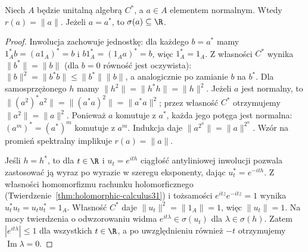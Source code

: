 \begin{lemat}
\label{lem:cstar-normal31}
Niech $A$ będzie unitalną algebrą $C^*$, a $a\in A$ elementem
normalnym. Wtedy $r(a)=\|a\|$.
Jeżeli $a=a^*$, to $\sigma(a)\subseteq\R$.
\end{lemat}
\begin{proof}
Inwolucja zachowuje jednostkę: dla każdego $b=a^*$
mamy $1_A^* b=(a1_A)^*=b$ i $b1_A^*=(1_Aa)^*=b$,
więc $1_A^*=1_A$. Z własności $C^*$ wynika
$\|b^*\|=\|b\|$ (dla $b=0$ równość jest oczywista):
$\|b\|^2=\|b^*b\|\le\|b^*\|\|b\|$,
a analogicznie po zamianie $b$ na $b^*$.
Dla samosprzężonego $h$ mamy
$\|h^2\|=\|h^*h\|=\|h\|^2$.
Jeżeli $a$ jest normalny, to
$\|(a^2)^*a^2\|=\|(a^*a)^2\|=\|a^*a\|^2$;
przez własność $C^*$ otrzymujemy $\|a^2\|=\|a\|^2$.
Ponieważ $a$ komutuje z $a^*$, każda jego potęga jest
normalna: $(a^m)^*=(a^*)^m$ komutuje z $a^m$.
Indukcja daje $\|a^{2^n}\|=\|a\|^{2^n}$.
Wzór na promień spektralny implikuje $r(a)=\|a\|$.

Jeśli $h=h^*$, to dla $t\in\R$ i $u_t=e^{ith}$
ciągłość antyliniowej inwolucji pozwala zastosować ją
wyraz po wyrazie w szeregu eksponenty, dając
$u_t^*=e^{-ith}$. Z własności homomorfizmu rachunku
holomorficznego (Twierdzenie~\ref{thm:holomorphic-calculus31})
i tożsamości $e^{itz}e^{-itz}=1$ wynika
$u_t^*u_t=u_tu_t^*=1_A$. Własność $C^*$ daje
$\|u_t\|^2=\|1_A\|=1$, więc $\|u_t\|=1$.
Na mocy twierdzenia o odwzorowaniu widma
$e^{it\lambda}\in\sigma(u_t)$ dla $\lambda\in\sigma(h)$.
Zatem $|e^{it\lambda}|\le1$ dla wszystkich $t\in\R$,
a po uwzględnieniu również $-t$ otrzymujemy
$\operatorname{Im}\lambda=0$.
\end{proof}

